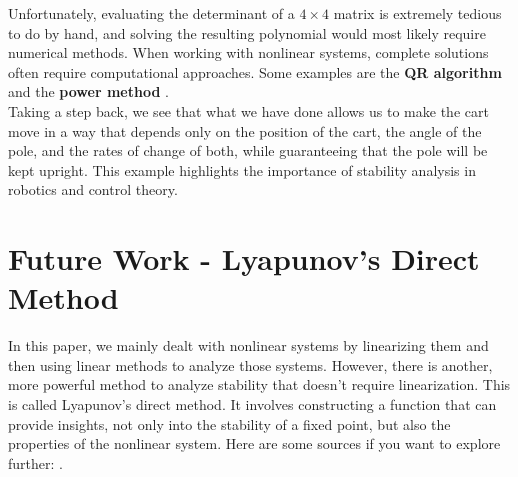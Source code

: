 \documentclass[12pt]{article}
\begin{document}
Unfortunately, evaluating the determinant of a $4\times 4$ matrix is extremely tedious to do by hand, and solving the resulting polynomial would most likely require numerical methods. When working with nonlinear systems, complete solutions often require computational approaches. Some examples are the \textbf{QR algorithm} \cite{Van23} and the \textbf{power method} \cite{Numerical-Eigenvalue}. \\

Taking a step back, we see that what we have done allows us to make the cart move in a way that depends only on the position of the cart, the angle of the pole, and the rates of change of both, while guaranteeing that the pole will be kept upright. This example highlights the importance of stability analysis in robotics and control theory.

\section{Future Work - Lyapunov's Direct Method}

In this paper, we mainly dealt with nonlinear systems by linearizing them and then using linear methods to analyze those systems. However, there is another, more powerful method to analyze stability that doesn't require linearization. This is called Lyapunov's direct method. It involves constructing a function that can provide insights, not only into the stability of a fixed point, but also the properties of the nonlinear system. Here are some sources if you want to explore further: \cite{Lya-Direct, Lya-Indirect}.



\end{document}
